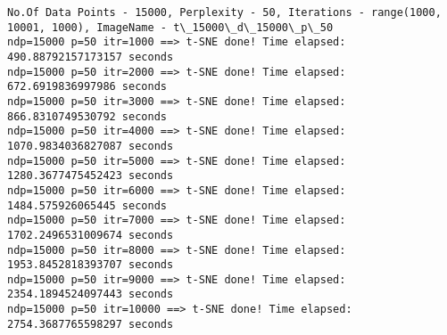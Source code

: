 \documentclass[11pt]{article}
\begin{document}
    \begin{Verbatim}[commandchars=\\\{\}]
No.Of Data Points - 15000, Perplexity - 50, Iterations - range(1000, 10001, 1000), ImageName - t\_15000\_d\_15000\_p\_50
ndp=15000 p=50 itr=1000 ==> t-SNE done! Time elapsed: 490.88792157173157 seconds
ndp=15000 p=50 itr=2000 ==> t-SNE done! Time elapsed: 672.6919836997986 seconds
ndp=15000 p=50 itr=3000 ==> t-SNE done! Time elapsed: 866.8310749530792 seconds
ndp=15000 p=50 itr=4000 ==> t-SNE done! Time elapsed: 1070.9834036827087 seconds
ndp=15000 p=50 itr=5000 ==> t-SNE done! Time elapsed: 1280.3677475452423 seconds
ndp=15000 p=50 itr=6000 ==> t-SNE done! Time elapsed: 1484.575926065445 seconds
ndp=15000 p=50 itr=7000 ==> t-SNE done! Time elapsed: 1702.2496531009674 seconds
ndp=15000 p=50 itr=8000 ==> t-SNE done! Time elapsed: 1953.8452818393707 seconds
ndp=15000 p=50 itr=9000 ==> t-SNE done! Time elapsed: 2354.1894524097443 seconds
ndp=15000 p=50 itr=10000 ==> t-SNE done! Time elapsed: 2754.3687765598297 seconds

    \end{Verbatim}

    \begin{center}
    \end{center}
    { \hspace*{\fill} \\}
    
    \begin{center}
    \end{center}
    { \hspace*{\fill} \\}
    
    \begin{center}
    \end{center}
    { \hspace*{\fill} \\}
    
    \begin{center}
    \end{center}
    { \hspace*{\fill} \\}
    
    \begin{center}
    \end{center}
    { \hspace*{\fill} \\}
    
\end{document}

